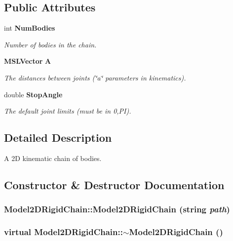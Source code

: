 \subsection*{Public Attributes}
\begin{CompactItemize}
\item 
int {\bf Num\-Bodies}
\begin{CompactList}\small\item\em Number of bodies in the chain.\item\end{CompactList}\item 
{\bf MSLVector} {\bf A}
\begin{CompactList}\small\item\em The distances between joints (\char`\"{}a\char`\"{} parameters in kinematics).\item\end{CompactList}\item 
double {\bf Stop\-Angle}
\begin{CompactList}\small\item\em The default joint limits (must be in 0,PI).\item\end{CompactList}\end{CompactItemize}


\subsection{Detailed Description}
A 2D kinematic chain of bodies.



\subsection{Constructor \& Destructor Documentation}
\subsubsection{\setlength{\rightskip}{0pt plus 5cm}Model2DRigid\-Chain::Model2DRigid\-Chain (string {\em path})}\label{classModel2DRigidChain_a0}


\subsubsection{\setlength{\rightskip}{0pt plus 5cm}virtual Model2DRigid\-Chain::$\sim$Model2DRigid\-Chain ()\hspace{0.3cm}{\tt  [inline, virtual]}}\label{classModel2DRigidChain_a1}




